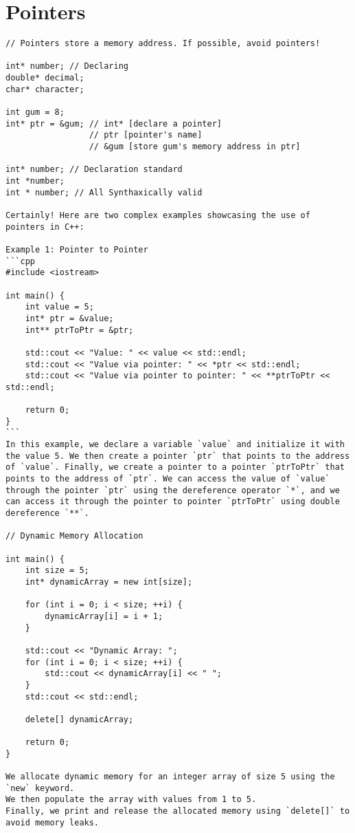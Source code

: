 \documentclass[openany]{report}
\begin{document}
\section{Pointers}

\begin{verbatim}
// Pointers store a memory address. If possible, avoid pointers!

int* number; // Declaring
double* decimal;
char* character;

int gum = 8;
int* ptr = &gum; // int* [declare a pointer]
                 // ptr [pointer's name]
                 // &gum [store gum's memory address in ptr]

int* number; // Declaration standard
int *number;
int * number; // All Synthaxically valid

Certainly! Here are two complex examples showcasing the use of pointers in C++:

Example 1: Pointer to Pointer
```cpp
#include <iostream>

int main() {
    int value = 5;
    int* ptr = &value;
    int** ptrToPtr = &ptr;

    std::cout << "Value: " << value << std::endl;
    std::cout << "Value via pointer: " << *ptr << std::endl;
    std::cout << "Value via pointer to pointer: " << **ptrToPtr << std::endl;

    return 0;
}
```
In this example, we declare a variable `value` and initialize it with the value 5. We then create a pointer `ptr` that points to the address of `value`. Finally, we create a pointer to a pointer `ptrToPtr` that points to the address of `ptr`. We can access the value of `value` through the pointer `ptr` using the dereference operator `*`, and we can access it through the pointer to pointer `ptrToPtr` using double dereference `**`.

// Dynamic Memory Allocation

int main() {
    int size = 5;
    int* dynamicArray = new int[size];

    for (int i = 0; i < size; ++i) {
        dynamicArray[i] = i + 1;
    }

    std::cout << "Dynamic Array: ";
    for (int i = 0; i < size; ++i) {
        std::cout << dynamicArray[i] << " ";
    }
    std::cout << std::endl;

    delete[] dynamicArray;

    return 0;
}

We allocate dynamic memory for an integer array of size 5 using the `new` keyword.
We then populate the array with values from 1 to 5.
Finally, we print and release the allocated memory using `delete[]` to avoid memory leaks.
\end{verbatim}
\end{document}
